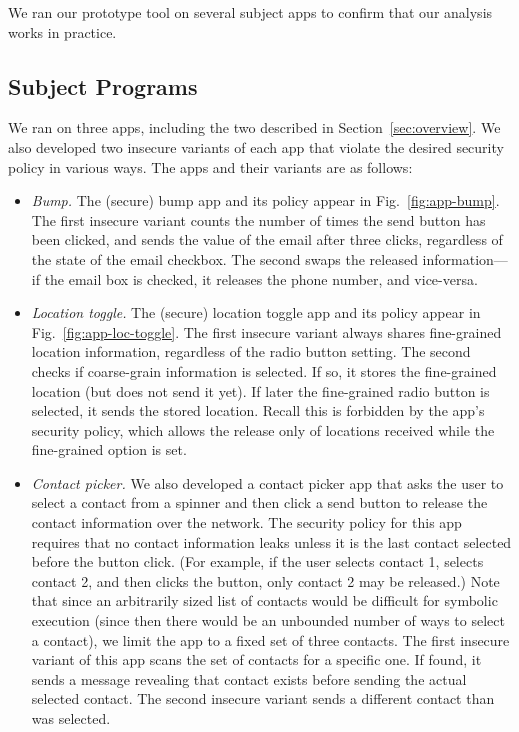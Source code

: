 \documentclass{entcs} \usepackage{entcsmacro}
\begin{document}
We ran our prototype tool on several subject apps to confirm that our
analysis works in practice.

\subsection{Subject Programs} We ran on three apps, including the two
described in Section~\ref{sec:overview}. We also developed two
insecure variants of each app that violate the
desired security policy in various ways. The apps and their variants
are as follows:

\begin{itemize}
\item \textit{Bump.} The (secure) bump app and its policy appear in
  Fig.~\ref{fig:app-bump}. The first insecure variant counts the number of
  times the send button has been clicked, and sends the value of the
  email after three clicks, regardless of the state of the email
  checkbox. The second swaps the released information---if the email
  box is checked, it releases the phone number, and vice-versa.

\item \textit{Location toggle.} The (secure) location toggle app and
  its policy appear in Fig.~\ref{fig:app-loc-toggle}. The first insecure
  variant always shares fine-grained location information, regardless
  of the radio button setting. The second checks if coarse-grain
  information is selected. If so, it stores the fine-grained location
  (but does not send it yet).  If later the fine-grained radio button
  is selected, it sends the stored location. Recall this is forbidden
  by the app's security policy, which allows the release only of locations
  received while the fine-grained option is set.

\item \textit{Contact picker.} We also developed a contact picker app
  that asks the user to select a contact from a spinner and then
  click a send button to release the contact information over the
  network. The security policy for this app requires that no contact
  information leaks unless it is the last contact selected before the
  button click. (For example, if the user selects contact 1,
  selects contact 2, and then clicks the button, only contact 2 may be
  released.) Note that since an arbitrarily sized list of contacts
  would be difficult for symbolic execution (since then there would be
  an unbounded number of ways to select a contact), we limit the app
  to a fixed set of three contacts.
  The first insecure variant of this app scans the set of contacts for a
  specific one. If found, it sends a message revealing that contact
  exists before sending the actual selected contact. The second insecure
  variant sends a different contact than was selected.
\end{itemize}
\end{document}
